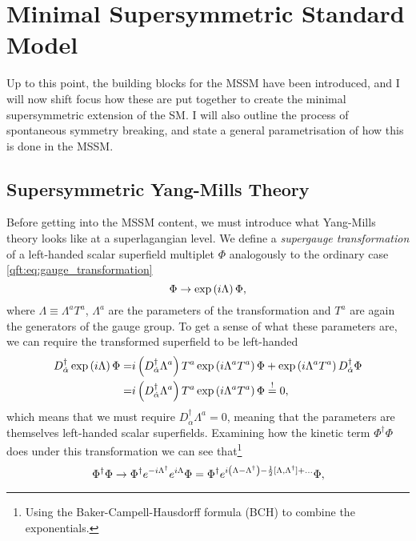 \documentclass[../main.tex]{subfiles}
\begin{document}
\section{Minimal Supersymmetric Standard Model}
Up to this point, the building blocks for the MSSM have been introduced, and I will now shift focus how these are put together to create the minimal supersymmetric extension of the SM.
I will also outline the process of spontaneous symmetry breaking, and state a general parametrisation of how this is done in the MSSM.

\subsection{Supersymmetric Yang-Mills Theory}
\label{susy:ssec:susy_yang_mills}
Before getting into the MSSM content, we must introduce what Yang-Mills theory
looks like at a superlagangian level. We define a \emph{supergauge
  transformation} of a left-handed scalar superfield multiplet \(\Phi\)
analogously to the ordinary case \cref{qft:eq:gauge_transformation}
\begin{equation}
  \label{susy:eq:supergauge_transformation}
  \Phi \to \operatorname{exp}\left(i \Lambda\right) \Phi,
\end{equation}
where \(\Lambda \equiv \Lambda^a T^a\), \(\Lambda^a\) are the parameters of the transformation and \(T^a\) are again the generators of the gauge group.
To get a sense of what these parameters are, we can require the transformed superfield to be left-handed
\begin{align*}
  D_{\dot{\alpha}}^\dagger \operatorname{exp}\left(i\Lambda\right) \Phi = & i\left(D_{\dot{\alpha}}^\dagger \Lambda^a\right) T^a \operatorname{exp}\left(i\Lambda^a T^a\right) \Phi + \operatorname{exp}\left(i\Lambda^a T^a\right) D_{\dot{\alpha}}^\dagger \Phi \\
  =                                                  & i\left(D_{\dot{\alpha}}^\dagger \Lambda^a\right) T^a \operatorname{exp}\left(i\Lambda^a T^a\right) \Phi \overset{!}{=} 0,
\end{align*}
which means that we must require \(D_{\dot{\alpha}}^\dagger \Lambda^a = 0\), meaning that the parameters are themselves left-handed scalar superfields.
Examining how the kinetic term \(\Phi^\dagger \Phi\) does under this transformation we can see that\footnote{Using the Baker-Campell-Hausdorff formula (BCH) to combine the exponentials.}
\begin{equation}
  \Phi^\dagger \Phi \to \Phi^\dagger e^{-i\Lambda^\dagger} e^{i\Lambda} \Phi = \Phi^\dagger e^{i\left(\Lambda - \Lambda^\dagger\right) - \frac{1}{2} [\Lambda,\Lambda^\dagger] + \ldots} \Phi,
\end{equation}
\end{document}
